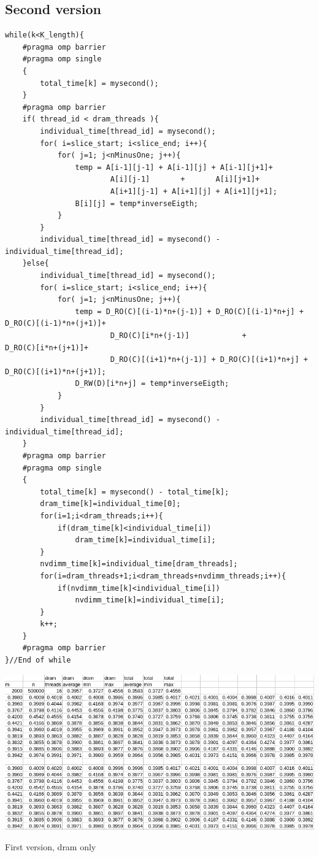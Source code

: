 \documentclass[12pt,a4paper,USenglish]{article}      %
\begin{document}
\subsection{Second version}
\begin{lstlisting}[caption=Second version]
while(k<K_length){
	#pragma omp barrier
	#pragma omp single
	{
		total_time[k] = mysecond();
	}
	#pragma omp barrier
	if( thread_id < dram_threads ){
		individual_time[thread_id] = mysecond();
		for( i=slice_start; i<slice_end; i++){
			for( j=1; j<nMinusOne; j++){
				temp = A[i-1][j-1] + A[i-1][j] + A[i-1][j+1]+
						A[i][j-1]       +       A[i][j+1]+
						A[i+1][j-1] + A[i+1][j] + A[i+1][j+1];
				B[i][j] = temp*inverseEigth;
			}
		}
		individual_time[thread_id] = mysecond() - individual_time[thread_id];
	}else{
		individual_time[thread_id] = mysecond();
		for( i=slice_start; i<slice_end; i++){
			for( j=1; j<nMinusOne; j++){
				temp = D_RO(C)[(i-1)*n+(j-1)] + D_RO(C)[(i-1)*n+j] + D_RO(C)[(i-1)*n+(j+1)]+
						D_RO(C)[i*n+(j-1)]            +            D_RO(C)[i*n+(j+1)]+
						D_RO(C)[(i+1)*n+(j-1)] + D_RO(C)[(i+1)*n+j] + D_RO(C)[(i+1)*n+(j+1)];
				D_RW(D)[i*n+j] = temp*inverseEigth;
			}
		}
		individual_time[thread_id] = mysecond() - individual_time[thread_id];
	}
	#pragma omp barrier
	#pragma omp single
	{
		total_time[k] = mysecond() - total_time[k];
		dram_time[k]=individual_time[0];
		for(i=1;i<dram_threads;i++){
			if(dram_time[k]<individual_time[i])
				dram_time[k]=individual_time[i];
		}
		nvdimm_time[k]=individual_time[dram_threads];
		for(i=dram_threads+1;i<dram_threads+nvdimm_threads;i++){
			if(nvdimm_time[k]<individual_time[i])
				nvdimm_time[k]=individual_time[i];
		}
		k++;
	}
	#pragma omp barrier
}//End of while
\end{lstlisting}

\begin{table}[!hbtp]
\includegraphics[scale=0.6]{First_version_DRAM_only_17_9_21.png}
\caption{First version, dram only}
\end{table}
\end{document}

